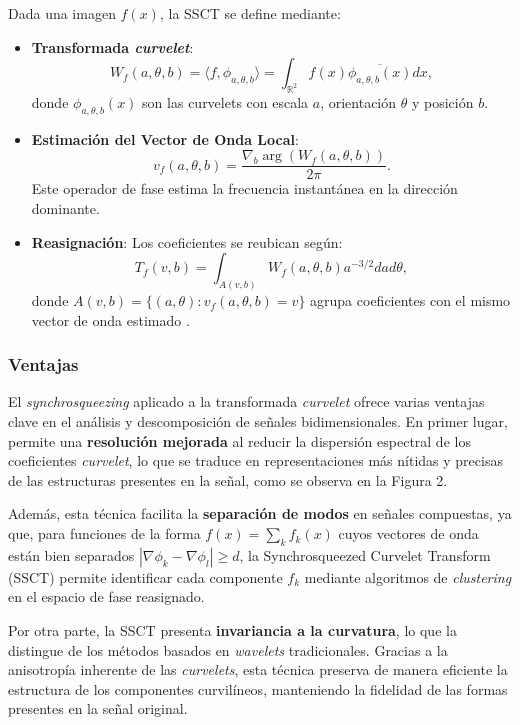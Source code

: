 Dada una imagen \(f(x)\), la SSCT se define mediante:
\begin{itemize}
    \item \textbf{Transformada \textit{curvelet}}: 
    \[
    W_f(a, \theta, b) = \langle f, \phi_{a,\theta,b} \rangle = \int_{\mathbb{R}^2} f(x) \overline{\phi_{a,\theta,b}(x)} dx,
    \]
    donde \(\phi_{a,\theta,b}(x)\) son las curvelets con escala \(a\), orientación \(\theta\) y posición \(b\).
    
    \item \textbf{Estimación del Vector de Onda Local}:
    \[
    v_f(a, \theta, b) = \frac{\nabla_b \arg(W_f(a, \theta, b))}{2\pi}.
    \]
    Este operador de fase estima la frecuencia instantánea en la dirección dominante.
    
    \item \textbf{Reasignación}:
    Los coeficientes se reubican según:
    \[
    T_f(v, b) = \int_{A(v, b)} W_f(a, \theta, b) a^{-3/2} da d\theta,
    \]
    donde \(A(v, b) = \{(a, \theta): v_f(a, \theta, b) = v\}\) agrupa coeficientes con el mismo vector de onda estimado \cite{SynchrosqueezedCurveletTransform}.
\end{itemize}

\subsubsection{Ventajas}

El \textit{synchrosqueezing} aplicado a la transformada \textit{curvelet} ofrece varias ventajas clave en el análisis y descomposición de señales bidimensionales. En primer lugar, permite una \textbf{resolución mejorada} al reducir la dispersión espectral de los coeficientes \textit{curvelet}, lo que se traduce en representaciones más nítidas y precisas de las estructuras presentes en la señal, como se observa en la Figura 2. 

Además, esta técnica facilita la \textbf{separación de modos} en señales compuestas, ya que, para funciones de la forma \( f(x) = \sum_k f_k(x) \) cuyos vectores de onda están bien separados \(\left|\nabla \phi_k - \nabla \phi_l\right| \geq d\), la Synchrosqueezed Curvelet Transform (SSCT) permite identificar cada componente \( f_k \) mediante algoritmos de \textit{clustering} en el espacio de fase reasignado.

Por otra parte, la SSCT presenta \textbf{invariancia a la curvatura}, lo que la distingue de los métodos basados en \textit{wavelets} tradicionales. Gracias a la anisotropía inherente de las \textit{curvelets}, esta técnica preserva de manera eficiente la estructura de los componentes curvilíneos, manteniendo la fidelidad de las formas presentes en la señal original.

